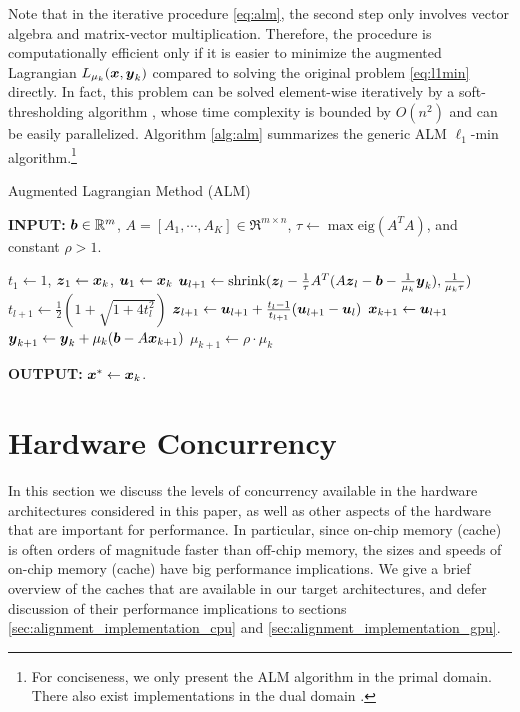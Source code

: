 \documentclass[10pt,twocolumn,letterpaper]{article}
\begin{document}
Note that in the iterative procedure \eqref{eq:alm}, the second
step only involves vector algebra and matrix-vector multiplication. Therefore,
the procedure is computationally efficient only if it is easier to minimize the
augmented Lagrangian $L_{\mu_k} ({\boldsymbol{x}},{\boldsymbol{y}}_k)$ compared to solving the original problem
\eqref{eq:l1min} directly. In fact, this problem can be solved element-wise
iteratively by a soft-thresholding algorithm \cite{WrightS2008,BeckA2009},
whose time complexity is bounded by $O(n^2)$ and can be easily parallelized.
Algorithm \ref{alg:alm} summarizes the generic ALM $\ell_1$-min algorithm.\footnote{For conciseness, we
only present the ALM algorithm in the primal domain. There also
exist implementations in the dual domain \cite{YangJ2009,YangA2010-ICIP}.}

 \begin{algorithm}[h]
\caption{Augmented Lagrangian Method (ALM)}
{\bf INPUT:} ${\boldsymbol{b}} \in {\mathbb{R}}^m$, $A=[A_1,\cdots, A_K] \in \Re^{m \times n}$, $\tau\leftarrow \max\mbox{eig}(A^TA)$, and constant $\rho>1$.
\begin{algorithmic}[1]
\STATE $t_1 \leftarrow 1$, ${\boldsymbol{z}}_1 \leftarrow {\boldsymbol{x}}_k$, ${\boldsymbol{u}}_1 \leftarrow {\boldsymbol{x}}_k$ 
\STATE ${\boldsymbol{u}}_{l+1}  \leftarrow \mbox{shrink}({\boldsymbol{z}}_l - \frac{1}{\tau}A^T(A{\boldsymbol{z}}_l - {\boldsymbol{b}} - \frac{1}{\mu_k}{\boldsymbol{y}}_k), \frac{1}{\mu_k\tau})$
\STATE $t_{l+1} \leftarrow \frac{1}{2}( 1 + \sqrt{1+4t_l^2})$
\STATE ${\boldsymbol{z}}_{l+1} \leftarrow {\boldsymbol{u}}_{l+1}+ \frac{t_l - 1}{t_{l+1}}({\boldsymbol{u}}_{l+1} - {\boldsymbol{u}}_l)$ 
\ENDWHILE 
\STATE ${\boldsymbol{x}}_{k+1} \leftarrow {\boldsymbol{u}}_{l+1}$ 
\STATE ${\boldsymbol{y}}_{k+1} \leftarrow {\boldsymbol{y}}_k + \mu_k ({\boldsymbol{b}} - A{\boldsymbol{x}}_{k+1})$ 
\STATE $\mu_{k+1} \leftarrow \rho\cdot\mu_k$ 
\ENDWHILE 
\end{algorithmic}

{\bf OUTPUT:} ${\boldsymbol{x}}^* \leftarrow {\boldsymbol{x}}_k$.
\label{alg:alm}
\end{algorithm}

\section{Hardware Concurrency} \label{sec:concurrency}

In this section we discuss the levels of concurrency available in the hardware
architectures considered in this paper, as well as other aspects of the
hardware that are important for performance.  In particular, since on-chip
memory (cache) is often orders of magnitude faster than off-chip memory, the
sizes and speeds of on-chip memory (cache) have big performance implications.
We give a brief overview of the caches that are available in our target
architectures, and defer discussion of their performance implications to
sections \ref{sec:alignment_implementation_cpu} and
\ref{sec:alignment_implementation_gpu}.
\end{document}
